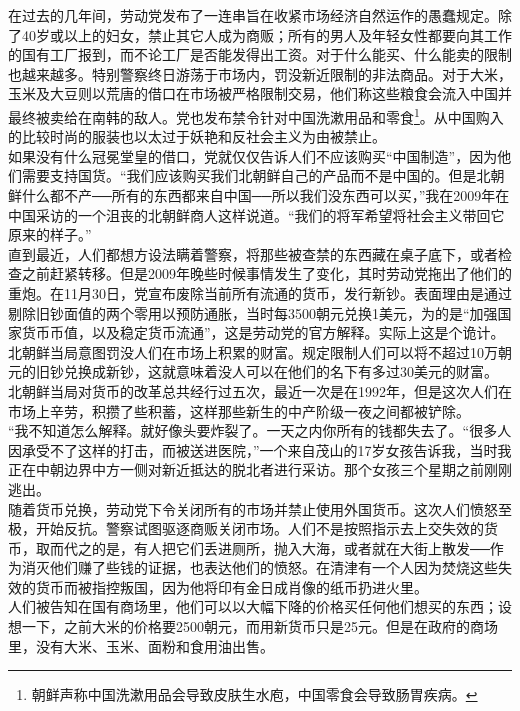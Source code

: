 在过去的几年间，劳动党发布了一连串旨在收紧市场经济自然运作的愚蠢规定。除了40岁或以上的妇女，禁止其它人成为商贩；所有的男人及年轻女性都要向其工作的国有工厂报到，而不论工厂是否能发得出工资。对于什么能买、什么能卖的限制也越来越多。特别警察终日游荡于市场内，罚没新近限制的非法商品。对于大米，玉米及大豆则以荒唐的借口在市场被严格限制交易，他们称这些粮食会流入中国并最终被卖给在南韩的敌人。党也发布禁令针对中国洗漱用品和零食\footnote{朝鲜声称中国洗漱用品会导致皮肤生水庖，中国零食会导致肠胃疾病。}。从中国购入的比较时尚的服装也以太过于妖艳和反社会主义为由被禁止。\\

如果没有什么冠冕堂皇的借口，党就仅仅告诉人们不应该购买“中国制造”，因为他们需要支持国货。“我们应该购买我们北朝鲜自己的产品而不是中国的。但是北朝鲜什么都不产──所有的东西都来自中国──所以我们没东西可以买，”我在2009年在中国采访的一个沮丧的北朝鲜商人这样说道。“我们的将军希望将社会主义带回它原来的样子。”\\

直到最近，人们都想方设法瞒着警察，将那些被查禁的东西藏在桌子底下，或者检查之前赶紧转移。但是2009年晚些时候事情发生了变化，其时劳动党拖出了他们的重炮。在11月30日，党宣布废除当前所有流通的货币，发行新钞。表面理由是通过剔除旧钞面值的两个零用以预防通胀，当时每3500朝元兑换1美元，为的是“加强国家货币币值，以及稳定货币流通”，这是劳动党的官方解释。实际上这是个诡计。北朝鲜当局意图罚没人们在市场上积累的财富。规定限制人们可以将不超过10万朝元的旧钞兑换成新钞，这就意味着没人可以在他们的名下有多过30美元的财富。\\

北朝鲜当局对货币的改革总共经行过五次，最近一次是在1992年，但是这次人们在市场上辛劳，积攒了些积蓄，这样那些新生的中产阶级一夜之间都被铲除。\\

“我不知道怎么解释。就好像头要炸裂了。一天之内你所有的钱都失去了。“很多人因承受不了这样的打击，而被送进医院，”一个来自茂山的17岁女孩告诉我，当时我正在中朝边界中方一侧对新近抵达的脱北者进行采访。那个女孩三个星期之前刚刚逃出。\\

随着货币兑换，劳动党下令关闭所有的市场并禁止使用外国货币。这次人们愤怒至极，开始反抗。警察试图驱逐商贩关闭市场。人们不是按照指示去上交失效的货币，取而代之的是，有人把它们丢进厕所，抛入大海，或者就在大街上散发──作为消灭他们赚了些钱的证据，也表达他们的愤怒。在清津有一个人因为焚烧这些失效的货币而被指控叛国，因为他将印有金日成肖像的纸币扔进火里。\\

人们被告知在国有商场里，他们可以以大幅下降的价格买任何他们想买的东西；设想一下，之前大米的价格要2500朝元，而用新货币只是25元。但是在政府的商场里，没有大米、玉米、面粉和食用油出售。\\

